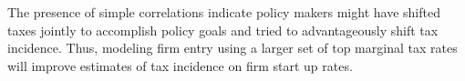 The presence of simple correlations indicate policy makers might have shifted taxes jointly to accomplish policy goals and tried to advantageously shift tax incidence. Thus, modeling firm entry using a larger set of top marginal tax rates will improve estimates of tax incidence on firm start up rates.